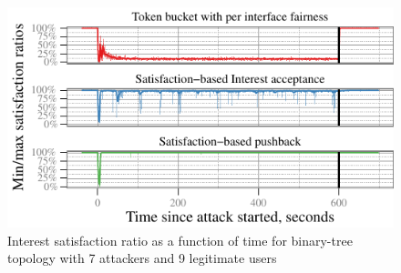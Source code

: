 \documentclass[10pt,conference]{IEEEtran}
\begin{document}
{%

\begin{figure}[]
  \centering
  \hspace{-0.8cm}\includegraphics[scale=0.8]{paper-topo-tree/tree-good-0-producer-gw}
  \caption{Interest satisfaction ratio as a function of time for binary-tree topology with 7 attackers and 9 legitimate users}
  \label{fig:small-scale attack progress}
\end{figure}



}
\end{document}
